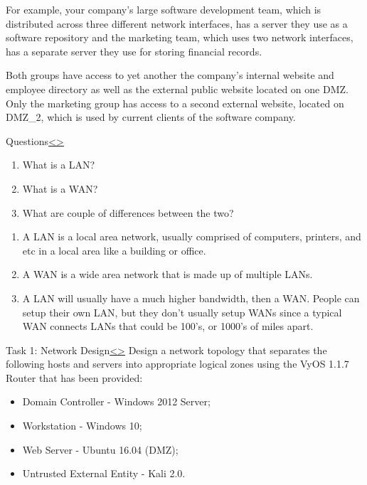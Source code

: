 \documentclass[12pt]{article}
\newenvironment{instructionblock}{\Large\bgroup}{\egroup}
\begin{document}
\par For example, your company's large software development team, which is distributed across three different network interfaces, has a server they use as a software repository and the marketing team, which uses two network interfaces, has a separate server they use for storing financial records.

\par Both groups have access to yet another the company's internal website and employee directory as well as the external public website located on one DMZ. Only the marketing group has access to a second external website, located on DMZ\_2, which is used by current clients of the software company.

\pagebreak
\begin{slide}{Questions}{\hyperref[slide 13]{\textless}\hyperref[slide 15]{\textgreater}}
\begin{instructionblock}
\begin{enumerate}
\item What is a LAN?
\item What is a WAN?
\item What are couple of differences between the two?
\end{enumerate}
\end{instructionblock}
\end{slide}
\begin{enumerate}
\item A LAN is a local area network, usually comprised of computers, printers, and etc in a local area like a building or office.
\item A WAN is a wide area network that is made up of multiple LANs.
\item A LAN will usually have a much higher bandwidth, then a WAN. People can setup their own LAN, but they don't usually setup WANs since a typical WAN connects LANs that could be 100's, or 1000's of miles apart.
\end{enumerate}

\pagebreak
\begin{slide}{Task 1: Network Design}{\hyperref[slide 14]{\textless}\hyperref[slide 16]{\textgreater}}
\begin{instructionblock}
Design a network topology that separates the following hosts and servers into appropriate logical zones using the VyOS 1.1.7 Router that has been provided:
\begin{itemize}
\item Domain Controller - Windows 2012 Server;
\item Workstation - Windows 10;
\item Web Server - Ubuntu 16.04 (DMZ);
\item Untrusted External Entity - Kali 2.0.
\end{itemize}
\end{instructionblock}
\end{slide}
\end{document}
